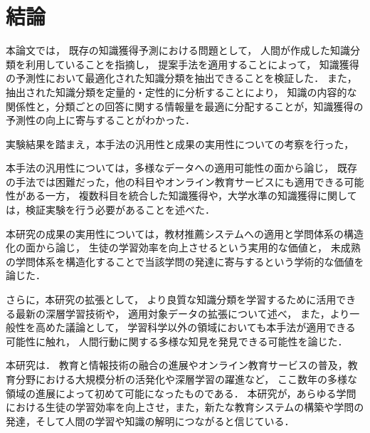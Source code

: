 \chapter{結論}
\label{chap:conlusion}
\fancyhf{}
\rhead{\thepage}
\cfoot{\thepage}


本論文では，
既存の知識獲得予測における問題として，
人間が作成した知識分類を利用していることを指摘し，
提案手法を適用することによって，
知識獲得の予測性において最適化された知識分類を抽出できることを検証した．
また，抽出された知識分類を定量的・定性的に分析することにより，
知識の内容的な関係性と，分類ごとの回答に関する情報量を最適に分配することが，知識獲得の予測性の向上に寄与することがわかった．
\vvspace

実験結果を踏まえ，本手法の汎用性と成果の実用性についての考察を行った，

本手法の汎用性については，多様なデータへの適用可能性の面から論じ，
既存の手法では困難だった，他の科目やオンライン教育サービスにも適用できる可能性がある一方，
複数科目を統合した知識獲得や，大学水準の知識獲得に関しては，検証実験を行う必要があることを述べた．

本研究の成果の実用性については，教材推薦システムへの適用と学問体系の構造化の面から論じ，
生徒の学習効率を向上させるという実用的な価値と，
未成熟の学問体系を構造化することで当該学問の発達に寄与するという学術的な価値を論じた．


\vvspace

さらに，本研究の拡張として，
より良質な知識分類を学習するために活用できる最新の深層学習技術や，
適用対象データの拡張について述べ，
また，より一般性を高めた議論として，
学習科学以外の領域においても本手法が適用できる可能性に触れ，
人間行動に関する多様な知見を発見できる可能性を論じた．
\vvspace

本研究は．
教育と情報技術の融合の進展やオンライン教育サービスの普及，教育分野における大規模分析の活発化や深層学習の躍進など，
ここ数年の多様な領域の進展によって初めて可能になったものである．
本研究が，あらゆる学問における生徒の学習効率を向上させ，また，新たな教育システムの構築や学問の発達，そして人間の学習や知識の解明につながると信じている．

